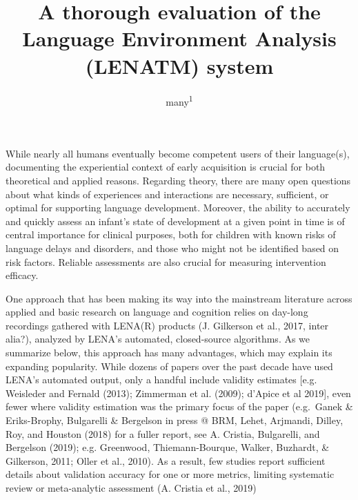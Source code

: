 \documentclass[english,floatsintext,man]{apa6}
\title{A thorough evaluation of the Language Environment Analysis (LENATM)
system}
\author{many\textsuperscript{1}}
\affiliation{
    \vspace{0.5cm}
          \textsuperscript{1}   }
\begin{document}
\maketitle

\setcounter{secnumdepth}{0}



While nearly all humans eventually become competent users of their
language(s), documenting the experiential context of early acquisition
is crucial for both theoretical and applied reasons. Regarding theory,
there are many open questions about what kinds of experiences and
interactions are necessary, sufficient, or optimal for supporting
language development. Moreover, the ability to accurately and quickly
assess an infant's state of development at a given point in time is of
central importance for clinical purposes, both for children with known
risks of language delays and disorders, and those who might not be
identified based on risk factors. Reliable assessments are also crucial
for measuring intervention efficacy.

One approach that has been making its way into the mainstream literature
across applied and basic research on language and cognition relies on
day-long recordings gathered with LENA(R) products (J. Gilkerson et al.,
2017, inter alia?), analyzed by LENA's automated, closed-source
algorithms. As we summarize below, this approach has many advantages,
which may explain its expanding popularity. While dozens of papers over
the past decade have used LENA's automated output, only a handful
include validity estimates {[}e.g. Weisleder and Fernald (2013);
Zimmerman et al. (2009); d'Apice et al 2019{]}, even fewer where
validity estimation was the primary focus of the paper (e.g.~Ganek \&
Eriks-Brophy, Bulgarelli \& Bergelson in press @ BRM, Lehet, Arjmandi,
Dilley, Roy, and Houston (2018) for a fuller report, see A. Cristia,
Bulgarelli, and Bergelson (2019); e.g. Greenwood, Thiemann-Bourque,
Walker, Buzhardt, \& Gilkerson, 2011; Oller et al., 2010). As a result,
few studies report sufficient details about validation accuracy for one
or more metrics, limiting systematic review or meta-analytic assessment
(A. Cristia et al., 2019)
\end{document}
